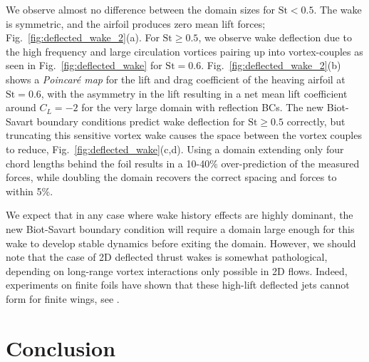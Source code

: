 \documentclass[11pt]{article}
\begin{document}
We observe almost no difference between the domain sizes for $\text{St}<0.5$. The wake is symmetric, and the airfoil produces zero mean lift forces; Fig.~\ref{fig:deflected_wake_2}(a). For $\text{St}\ge 0.5$, we observe wake deflection due to the high frequency and large circulation vortices pairing up into vortex-couples as seen in Fig.~\ref{fig:deflected_wake} for $\text{St}=0.6$. Fig.~\ref{fig:deflected_wake_2}(b) shows a \emph{Poincar\'e map} for the lift and drag coefficient of the heaving airfoil at $\text{St}=0.6$, with the asymmetry in the lift resulting in a net mean lift coefficient around $C_L=-2$ for the very large domain with reflection BCs. The new Biot-Savart boundary conditions predict wake deflection for $\text{St}\ge 0.5$ correctly, but truncating this sensitive vortex wake causes the space between the vortex couples to reduce, Fig.~\ref{fig:deflected_wake}(c,d). Using a domain extending only four chord lengths behind the foil results in a 10-40\% over-prediction of the measured forces, while doubling the domain recovers the correct spacing and forces to within 5\%.

We expect that in any case where wake history effects are highly dominant, the new Biot-Savart boundary condition will require a domain large enough for this wake to develop stable dynamics before exiting the domain. However, we should note that the case of 2D deflected thrust wakes is somewhat pathological, depending on long-range vortex interactions only possible in 2D flows. Indeed, experiments on finite foils have shown that these high-lift deflected jets cannot form for finite wings, see \cite{Calderon2014OnWings, Godoy-Diana2008TransitionFoil}.
 
\section{Conclusion}
\end{document}
